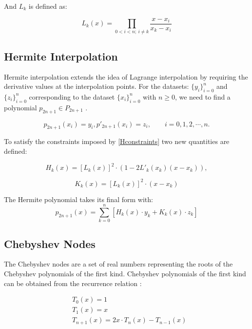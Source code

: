 \documentclass[11pt]{article}%
\begin{document}
And $L_k$ is defined as:

\begin{equation}
L_k(x) = \prod_{0<i<n;\ i \ne k} \frac{x - x_i}{x_k - x_i}
\end{equation}

\subsection{Hermite Interpolation}

Hermite interpolation extends the idea of Lagrange interpolation by requiring the derivative values at the interpolation points. For the datasets: $\{y_i\}^n_{i=0}$ and $\{z_i\}^n_{i=0}$ corresponding to the dataset $\{x_i\}^n_{i=0}$ with $n \geq 0$, we need to find a polynomial $p_{2n+1} \in P_{2n+1}$ \cite{LHK4}.

\begin{equation} \label{Hconstraints}
p_{2n+1}(x_i) = y_i, p'_{2n+1}(x_i) = z_i, \qquad i = 0, 1, 2, \cdots, n.
\end{equation}

To satisfy the constraints imposed by \eqref{Hconstraints} two new quantities are defined:

\begin{equation} \label{Hkeq}
H_{k}(x) = [L_k(x)]^2\cdot (1 - 2L'_k(x_k)(x-x_k)),
\end{equation}

\begin{equation} \label{Kkeq}
K_{k}(x) = [L_k(x)]^2\cdot (x-x_k)
\end{equation}

The Hermite polynomial takes its final form with:
\begin{equation} \label{hermiteEq}
p_{2n+1}(x) = \sum_{k=0}^{n}[H_{k}(x)\cdot y_k + K_{k}(x)\cdot z_k]
\end{equation}

\subsection{Chebyshev Nodes}
The Chebyshev nodes are a set of real numbers representing the roots of the Chebyshev polynomials of the first kind. Chebyshev polynomials of the first kind can be obtained from the recurrence relation \cite{LHK5}:

\begin{equation}
\begin{split} %
&T_0(x) = 1\\
&T_1(x) = x\\
&T_{n + 1}(x) = 2x \cdot T_n(x) - T_{n - 1}(x)
\end{split}
\end{equation}
\end{document}
